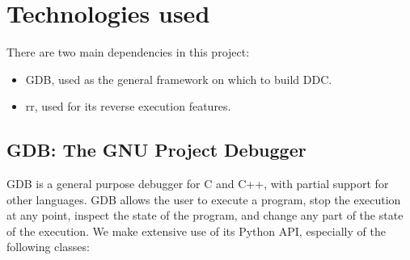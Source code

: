 \section{Technologies used}
There are two main dependencies in this project:
\begin{itemize}
    \item GDB, used as the general framework on which to build DDC.
    \item rr, used for its reverse execution features.
\end{itemize}
\subsection{GDB: The GNU Project Debugger}
GDB \cite{gdb} is a general purpose debugger for C and C++, with partial support for other languages. GDB allows the user to execute a program, stop the execution at any point, inspect the state of the program, and change any part of the state of the execution.
%
We make extensive use of its Python API, especially of the following classes:

